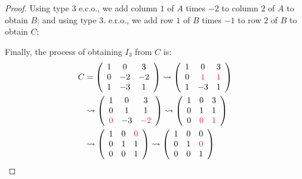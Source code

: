 \begin{proof}
Using type 3 e.c.o., we add column \(1\) of \(A\) times \(-2\) to column \(2\) of \(A\) to obtain \(B\);
and using type 3. e.r.o., we add row \(1\) of \(B\) times \(-1\) to row \(2\) of \(B\) to obtain \(C\);

Finally, the process of obtaining \(I_3\) from \(C\) is:
\[
    \begin{aligned}
    C & =\left(\begin{array}{ccc}
        1 & 0 & 3 \\
        0 & -2 & -2 \\
        1 & -3 & 1
    \end{array}\right)
    \rightsquigarrow
    \left(\begin{array}{ccc}
        1 & 0 & 3 \\
        0 & \RED{1} & \RED{1} \\
        1 & -3 & 1
    \end{array}\right) \\
      & \rightsquigarrow
    \left(\begin{array}{ccc}
        1 & 0 & 3 \\
        0 & 1 & 1 \\
        \RED{0} & -3 & \RED{-2}
    \end{array}\right)
    \rightsquigarrow
    \left(\begin{array}{ccc}
        1 & 0 & 3 \\
        0 & 1 & 1 \\
        0 & \RED{0} & \RED{1}
    \end{array}\right) \\
    & \rightsquigarrow
    \left(\begin{array}{ccc}
        1 & 0 & \RED{0} \\
        0 & 1 & 1 \\
        0 & 0 & 1
    \end{array}\right)
    \rightsquigarrow\left(\begin{array}{ccc}
        1 & 0 & 0 \\
        0 & 1 & \RED{0} \\
        0 & 0 & 1
    \end{array}\right)
\end{aligned}
\]
\end{proof}

